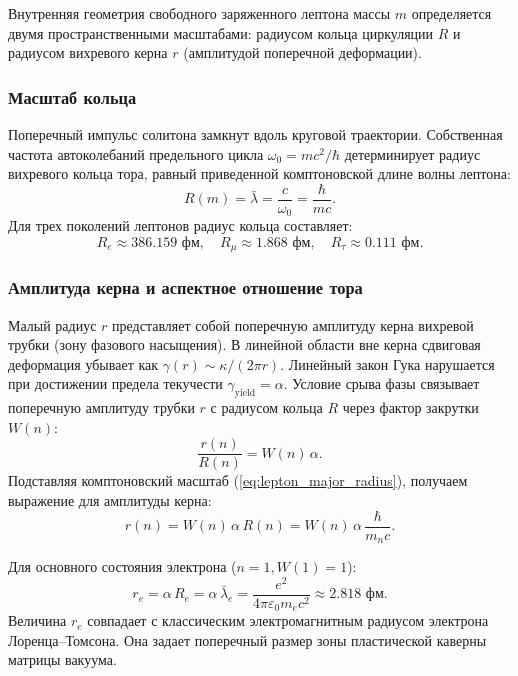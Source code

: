 \documentclass[11pt,a4paper]{article}
\providecommand{\lambdabar}{\bar{\lambda}}
\theoremstyle{definition}
\theoremstyle{remark}
\begin{document}
Внутренняя геометрия свободного заряженного лептона массы $m$ определяется двумя пространственными масштабами: радиусом кольца циркуляции $R$ и радиусом вихревого керна $r$ (амплитудой поперечной деформации).
	
\subsubsection{Масштаб кольца}
Поперечный импульс солитона замкнут вдоль круговой траектории. Собственная частота автоколебаний предельного цикла $\omega_0 = m c^2 / \hbar$ детерминирует радиус вихревого кольца тора, равный приведенной комптоновской длине волны лептона:
\begin{equation}
R(m) = \lambdabar = \frac{c}{\omega_0} = \frac{\hbar}{m c}.
\label{eq:lepton_major_radius}
\end{equation}
Для трех поколений лептонов радиус кольца составляет:
\begin{equation}
	R_e \approx 386.159\text{ фм}, \quad R_\mu \approx 1.868\text{ фм}, \quad R_\tau \approx 0.111\text{ фм}.
	\label{eq:lepton_radii_numerical}
\end{equation}
	
\subsubsection{Амплитуда керна и аспектное отношение тора}
Малый радиус $r$ представляет собой поперечную амплитуду керна вихревой трубки (зону фазового насыщения).
В линейной области вне керна сдвиговая деформация убывает как $\gamma(r) \sim \kappa / (2\pi r)$. Линейный закон Гука нарушается при достижении предела текучести $\gamma_{\mathrm{yield}} = \alpha$. Условие срыва фазы связывает поперечную амплитуду трубки $r$ с радиусом кольца $R$ через фактор закрутки $W(n)$:
\begin{equation}
	\frac{r(n)}{R(n)} = W(n) \, \alpha.
\label{eq:lepton_aspect_ratio}
\end{equation}
Подставляя комптоновский масштаб (\ref{eq:lepton_major_radius}), получаем выражение для амплитуды керна:
\begin{equation}
	r(n) = W(n) \, \alpha \, R(n) = W(n) \, \alpha \, \frac{\hbar}{m_n c}.
\label{eq:core_amplitude_exact}
\end{equation}
	
Для основного состояния электрона ($n=1, W(1)=1$):
\begin{equation}
	r_e = \alpha \, R_e = \alpha \, \lambdabar_e = \frac{e^2}{4\pi\varepsilon_0 m_e c^2} \approx 2.818\text{ фм}.
	\label{eq:classical_electron_radius}
\end{equation}
	Величина $r_e$ совпадает с классическим электромагнитным радиусом электрона Лоренца--Томсона. Она задает поперечный размер зоны пластической каверны матрицы вакуума.
	
\end{document}
